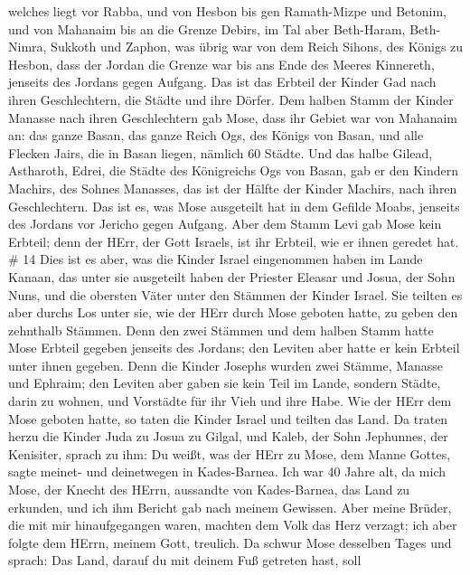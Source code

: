 welches liegt vor Rabba,  und von Hesbon bis gen
Ramath-Mizpe und Betonim, und von Mahanaim bis an die Grenze Debirs,
 im Tal aber Beth-Haram, Beth-Nimra, Sukkoth und Zaphon,
was übrig war von dem Reich Sihons, des Königs zu Hesbon, dass der
Jordan die Grenze war bis ans Ende des Meeres Kinnereth, jenseits des
Jordans gegen Aufgang.  Das ist das Erbteil der Kinder Gad
nach ihren Geschlechtern, die Städte und ihre Dörfer.  Dem
halben Stamm der Kinder Manasse nach ihren Geschlechtern gab Mose,
 dass ihr Gebiet war von Mahanaim an: das ganze Basan, das
ganze Reich Ogs, des Königs von Basan, und alle Flecken Jairs, die in
Basan liegen, nämlich 60 Städte.  Und das halbe Gilead,
Astharoth, Edrei, die Städte des Königreichs Ogs von Basan, gab er den
Kindern Machirs, des Sohnes Manasses, das ist der Hälfte der Kinder
Machirs, nach ihren Geschlechtern.  Das ist es, was Mose
ausgeteilt hat in dem Gefilde Moabs, jenseits des Jordans vor Jericho
gegen Aufgang.  Aber dem Stamm Levi gab Mose kein Erbteil;
denn der HErr, der Gott Israels, ist ihr Erbteil, wie er ihnen geredet
hat. \# 14  Dies ist es aber, was die Kinder Israel
eingenommen haben im Lande Kanaan, das unter sie ausgeteilt haben der
Priester Eleasar und Josua, der Sohn Nuns, und die obersten Väter unter
den Stämmen der Kinder Israel.  Sie teilten es aber durchs
Los unter sie, wie der HErr durch Mose geboten hatte, zu geben den
zehnthalb Stämmen.  Denn den zwei Stämmen und dem halben
Stamm hatte Mose Erbteil gegeben jenseits des Jordans; den Leviten aber
hatte er kein Erbteil unter ihnen gegeben.  Denn die Kinder
Josephs wurden zwei Stämme, Manasse und Ephraim; den Leviten aber gaben
sie kein Teil im Lande, sondern Städte, darin zu wohnen, und Vorstädte
für ihr Vieh und ihre Habe.  Wie der HErr dem Mose geboten
hatte, so taten die Kinder Israel und teilten das Land.  Da
traten herzu die Kinder Juda zu Josua zu Gilgal, und Kaleb, der Sohn
Jephunnes, der Kenisiter, sprach zu ihm: Du weißt, was der HErr zu Mose,
dem Manne Gottes, sagte meinet- und deinetwegen in Kades-Barnea.
 Ich war 40 Jahre alt, da mich Mose, der Knecht des HErrn,
aussandte von Kades-Barnea, das Land zu erkunden, und ich ihm Bericht
gab nach meinem Gewissen.  Aber meine Brüder, die mit mir
hinaufgegangen waren, machten dem Volk das Herz verzagt; ich aber folgte
dem HErrn, meinem Gott, treulich.  Da schwur Mose desselben
Tages und sprach: Das Land, darauf du mit deinem Fuß getreten hast, soll
